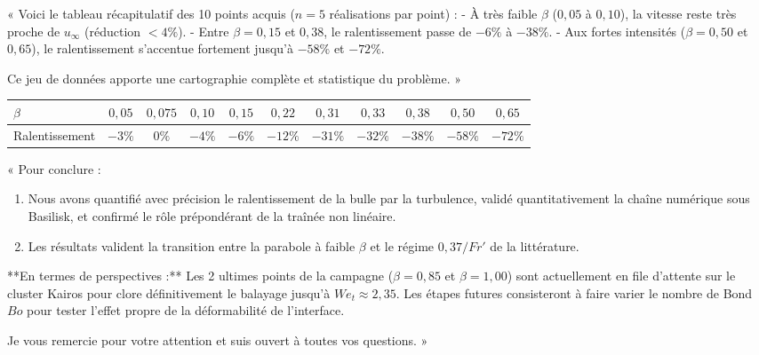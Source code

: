 \documentclass[11pt,a4paper]{article}
\begin{document}
\begin{tcolorbox}[slidebox,title=Diapositive 8 : Bilan Synthétique de la Campagne]
\begin{tcolorbox}[keybox,title=Ce qu'il faut dire à l'oral :]
« Voici le tableau récapitulatif des 10 points acquis ($n=5$ réalisations par point) :
- À très faible $\beta$ ($0{,}05$ à $0{,}10$), la vitesse reste très proche de $u_\infty$ (réduction $< 4\%$).
- Entre $\beta = 0{,}15$ et $0{,}38$, le ralentissement passe de $-6\%$ à $-38\%$.
- Aux fortes intensités ($\beta = 0{,}50$ et $0{,}65$), le ralentissement s'accentue fortement jusqu'à $-58\%$ et $-72\%$.

Ce jeu de données apporte une cartographie complète et statistique du problème. »
\end{tcolorbox}

\begin{center}
\small
\begin{tabular}{lcccccccccc}
    \toprule
    $\beta$ & $0{,}05$ & $0{,}075$ & $0{,}10$ & $0{,}15$ & $0{,}22$ & $0{,}31$ & $0{,}33$ & $0{,}38$ & $0{,}50$ & $0{,}65$ \\
    \midrule
    Ralentissement & $-3\%$ & $0\%$ & $-4\%$ & $-6\%$ & $-12\%$ & $-31\%$ & $-32\%$ & $-38\%$ & $-58\%$ & $-72\%$ \\
    \bottomrule
\end{tabular}
\end{center}
\end{tcolorbox}

\begin{tcolorbox}[slidebox,title=Diapositive 9 : Conclusion et Perspectives]
\begin{tcolorbox}[keybox,title=Ce qu'il faut dire à l'oral :]
« Pour conclure :
\begin{enumerate}
    \item Nous avons quantifié avec précision le ralentissement de la bulle par la turbulence, validé quantitativement la chaîne numérique sous Basilisk, et confirmé le rôle prépondérant de la traînée non linéaire.
    \item Les résultats valident la transition entre la parabole à faible $\beta$ et le régime $0{,}37/Fr'$ de la littérature.
\end{enumerate}

**En termes de perspectives :** Les 2 ultimes points de la campagne ($\beta=0{,}85$ et $\beta=1{,}00$) sont actuellement en file d'attente sur le cluster Kairos pour clore définitivement le balayage jusqu'à $We_t \approx 2{,}35$. Les étapes futures consisteront à faire varier le nombre de Bond $Bo$ pour tester l'effet propre de la déformabilité de l'interface.

Je vous remercie pour votre attention et suis ouvert à toutes vos questions. »
\end{tcolorbox}
\end{tcolorbox}
\end{document}
